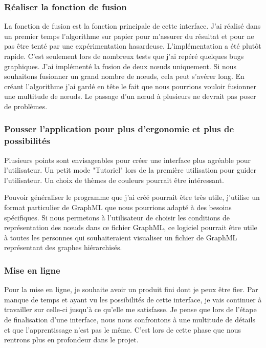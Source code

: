 \documentclass[french]{article}
\begin{document}
  \subsubsection{Réaliser la fonction de fusion}

    La fonction de fusion est la fonction principale de cette interface. J'ai réalisé dans un premier temps l'algorithme sur papier pour m'assurer du résultat et pour ne pas être tenté par une expérimentation hasardeuse. L’implémentation a été plutôt rapide. C'est seulement lors de nombreux tests que j'ai repéré quelques bugs graphiques. J'ai implémenté la fusion de deux nœuds uniquement. Si nous souhaitons fusionner un grand nombre de nœuds, cela peut s’avérer long. En créant l'algorithme j'ai gardé en tête le fait que nous pourrions vouloir fusionner une multitude de nœuds. Le passage d'un nœud à plusieurs ne devrait pas poser de problèmes. 



  \subsubsection{Pousser l'application pour plus d'ergonomie et plus de possibilités }

    Plusieurs points sont envisageables pour créer une interface plus agréable pour l'utilisateur. Un petit mode "Tutoriel" lors de la première utilisation pour guider l'utilisateur. Un choix de thèmes de couleurs pourrait être intéressant. 

    Pouvoir généraliser le programme que j'ai créé pourrait être très utile, j'utilise un format particulier de GraphML que nous pourrions adapté à des besoins spécifiques. Si nous permetons à l'utilisateur de choisir les conditions de représentation des nœuds dans ce fichier GraphML, ce logiciel pourrait être utile à toutes les personnes qui souhaiteraient visualiser un fichier de GraphML représentant des graphes hiérarchisés. 

  \subsubsection{Mise en ligne}

    Pour la mise en ligne, je souhaite avoir un produit fini dont je peux être fier. Par manque de temps et ayant vu les possibilités de cette interface, je vais continuer à travailler sur celle-ci jusqu'à ce qu'elle me satisfasse. Je pense que lors de l’étape de finalisation d'une interface, nous nous confrontons à une multitude de détails et que l'apprentissage n'est pas le même. C'est lors de cette phase que nous rentrons plus en profondeur dans le projet. 
    
\end{document}
